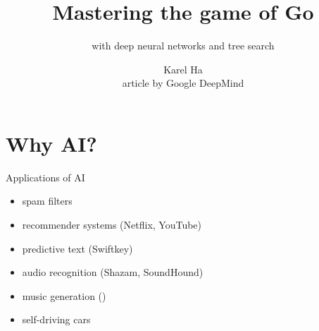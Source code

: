 \documentclass{beamer}
\title{Mastering the game of Go}
\subtitle{with deep neural networks and tree search}
\date{}                         %
\author{Karel Ha \\ article by Google DeepMind}
\institute{Optimization Seminar, 20\textsuperscript{th} April 2016}
\begin{document}
  {
    \maketitle
  }


  \section{Why AI?}

  \begin{frame}{Applications of AI}
    \begin{itemize}[<+- | alert@+>]
      \item spam filters
      \item recommender systems (Netflix, YouTube)
      \item predictive text (Swiftkey)
      \item audio recognition (Shazam, SoundHound)
      \item music generation (\cite{DeepHear})
      \item self-driving cars
    \end{itemize}
  \end{frame}
\end{document}
